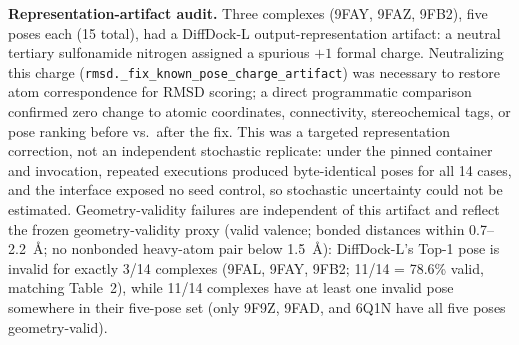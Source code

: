 \documentclass{article}
\begin{document}
\textbf{Representation-artifact audit.} Three complexes (9FAY, 9FAZ, 9FB2), five poses each (15 total), had a DiffDock-L output-representation artifact: a neutral tertiary sulfonamide nitrogen assigned a spurious $+1$ formal charge. Neutralizing this charge (\texttt{rmsd.\_fix\_known\_pose\_charge\_artifact}) was necessary to restore atom correspondence for RMSD scoring; a direct programmatic comparison confirmed zero change to atomic coordinates, connectivity, stereochemical tags, or pose ranking before vs.\ after the fix. This was a targeted representation correction, not an independent stochastic replicate: under the pinned container and invocation, repeated executions produced byte-identical poses for all 14 cases, and the interface exposed no seed control, so stochastic uncertainty could not be estimated. Geometry-validity failures are independent of this artifact and reflect the frozen geometry-validity proxy (valid valence; bonded distances within 0.7--2.2~\AA; no nonbonded heavy-atom pair below 1.5~\AA): DiffDock-L's Top-1 pose is invalid for exactly 3/14 complexes (9FAL, 9FAY, 9FB2; 11/14 = 78.6\% valid, matching Table~2), while 11/14 complexes have at least one invalid pose somewhere in their five-pose set (only 9F9Z, 9FAD, and 6Q1N have all five poses geometry-valid).
\end{document}
